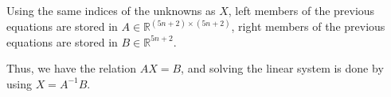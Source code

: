 \documentclass{article}
\begin{document}
Using the same indices of the unknowns as $X$, left members of the previous equations are stored in $A \in  \mathbb{R}^{(5n+2) \times (5n+2)}$, right members of the previous equations are stored in $B \in \mathbb{R}^{5n+2}$.

Thus, we have the relation $AX = B$, and solving the linear system is done by using $X = A^{-1} B$.
\end{document}
